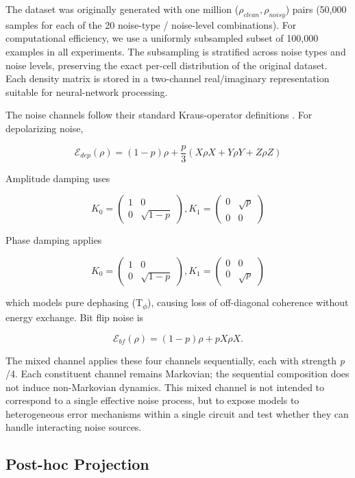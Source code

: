 \documentclass[11pt]{article}
\begin{document}
The dataset was originally generated with one million (\(\rho_{clean}, \rho_{noisy}\)) pairs (50,000 samples for each of the 20 noise-type / noise-level combinations). For computational efficiency, we use a uniformly subsampled subset of 100,000 examples in all experiments. The subsampling is stratified across noise types and noise levels, preserving the exact per-cell distribution of the original dataset. Each density matrix is stored in a two-channel real/imaginary representation suitable for neural-network processing.

The noise channels follow their standard Kraus-operator definitions \citep{nielsen_chuang_2010}. For depolarizing noise,

$$
\mathcal{E}_{dep}(\rho) = (1-p)\rho + \frac{p}{3}(X \rho X + Y \rho Y + Z \rho Z)
$$

Amplitude damping uses

$$
K_0 = \begin{pmatrix}
1 & 0\\
0 & \sqrt{1-p}
\end{pmatrix},
 K_1 = \begin{pmatrix}
0 & \sqrt{p}\\
0 & 0
\end{pmatrix}
$$

Phase damping applies

$$
K_0 = \begin{pmatrix}
1 & 0\\
0 & \sqrt{1-p}
\end{pmatrix},
K_1 = \begin{pmatrix}
0 & 0\\
0 & \sqrt{p}
\end{pmatrix}
$$

which models pure dephasing (T\textsubscript{\(\phi\)}), causing loss of off-diagonal coherence without energy exchange. Bit flip noise is

$$
\mathcal{E}_{bf}(\rho) = (1-p)\rho + p X \rho X.
$$

The mixed channel applies these four channels sequentially, each with strength \emph{p} /4. Each constituent channel remains Markovian; the sequential composition does not induce non-Markovian dynamics. This mixed channel is not intended to correspond to a single effective noise process, but to expose models to heterogeneous error mechanisms within a single circuit and test whether they can handle interacting noise sources.

\newpage
\subsection{Post-hoc Projection}
\label{sec:orgbfb9579}
\end{document}
